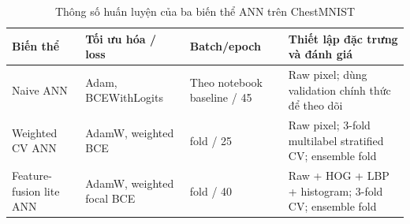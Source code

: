 \begin{table}[H]
\centering
\caption{Thông số huấn luyện của ba biến thể ANN trên ChestMNIST}
\label{tab:chestmnist-ann-hyperparameters}
\small
\begin{tabularx}{\textwidth}{>{\raggedright\arraybackslash}p{3.2cm} >{\raggedright\arraybackslash}p{3cm} >{\raggedright\arraybackslash}p{2.1cm} >{\raggedright\arraybackslash}X}
\toprule
Biến thể & Tối ưu hóa / loss & Batch/epoch & Thiết lập đặc trưng và đánh giá \\
\midrule
Naive ANN & Adam, BCEWithLogits & Theo notebook baseline / 45 & Raw pixel; dùng validation chính thức để theo dõi \\
Weighted CV ANN & AdamW, weighted BCE & 3 fold / 25 & Raw pixel; 3-fold multilabel stratified CV; ensemble fold \\
Feature-fusion lite ANN & AdamW, weighted focal BCE & 3 fold / 40 & Raw + HOG + LBP + histogram; 3-fold CV; ensemble fold \\
\bottomrule
\end{tabularx}
\end{table}
